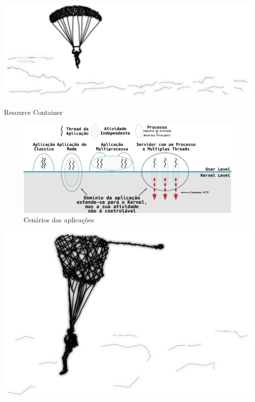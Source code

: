\documentclass[xcolor={usenames,svgnames,dvipsnames},brazil,english,12pt,aspectratio=149]{beamer}
\begin{document}
\begin{frame}[plain]
  \includegraphics[width=\textwidth]{presentation_cap2_four}
\end{frame}

\begin{frame}{Resource Container}
	\begin{figure}[!h]
		\centering
		\includegraphics[width=\textwidth]{resource_constainer_scenarios} 
		\caption{Cenários das aplicações}
		\label{fig:resource_constainer_scenarios}
	\end{figure}
\end{frame}

\begin{frame}[plain]
  \includegraphics[width=\textwidth]{presentation_cap2_five}
\end{frame}
\end{document}
